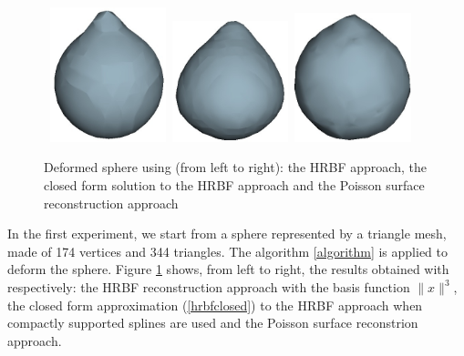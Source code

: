 \documentclass[ams]{U-AizuGT}
\begin{document}
\begin{figure}
\hbox{
\centering\includegraphics[width=0.3\textwidth]{deformed_sphere_hrbf.jpg}
\centering\includegraphics[width=0.3\textwidth]{deformed_sphere_hrbfclosed-3.jpg}
\centering\includegraphics[width=0.3\textwidth]{deformed_sphere_poisson.jpg}
}
\caption{Deformed sphere using (from left to right): the HRBF approach, 
the closed form solution to the HRBF approach and the Poisson surface
reconstruction approach} \label{fig:sphere}
\end{figure}

In the first experiment, we start from a sphere represented by a triangle mesh, 
made of 174 vertices and 344 triangles. The algorithm \ref{algorithm} is applied to 
deform the sphere. Figure \ref{fig:sphere} shows, from left to right,  
the results obtained with respectively: the HRBF reconstruction approach with 
the basis function $\|x\|^3$, the closed form approximation (\ref{hrbfclosed}) 
to the HRBF approach when compactly supported splines are used 
and the Poisson surface reconstrion approach.
\end{document}
